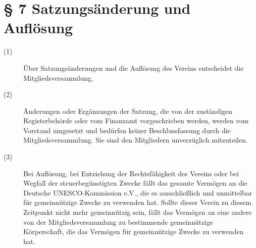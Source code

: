 \documentclass[a4paper,12pt]{scrartcl}
\begin{document}
\section*{\S{} 7 Satzungsänderung und Auflösung}
\begin{description} 

\item[(1)] Über Satzungsänderungen und die Auflösung des Vereins entscheidet die Mitgliedsversammlung.
\item[(2)] Änderungen oder Ergänzungen der Satzung, die von der zuständigen Registerbehörde oder vom Finanzamt vorgeschrieben werden, werden vom Vorstand umgesetzt und bedürfen keiner Beschlussfassung durch die Mitgliedsversammlung. Sie sind den Mitgliedern unverzüglich mitzuteilen.
\item[(3)] Bei Auflösung, bei Entziehung der Rechtsfähigkeit des Vereins oder bei Wegfall der steuerbegünstigten Zwecke fällt das gesamte Vermögen an die Deutsche UNESCO-Kommission e.V., die es ausschließlich und unmittelbar für gemeinnützige Zwecke zu verwenden hat. Sollte dieser Verein zu diesem Zeitpunkt nicht mehr gemeinnützig sein, fällt das Vermögen an eine andere von der Mitgliedsversammlung zu bestimmende gemeinnützige Körperschaft, die das Vermögen für gemeinnützige Zwecke zu verwenden hat.

\end{description}
\end{document}
